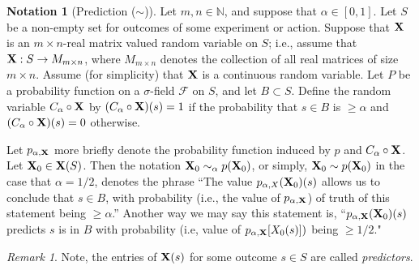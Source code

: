 \documentclass[12pt]{amsart}
\newcommand{\NN}{{\mathbb N}}
\theoremstyle{definition}
\newtheorem{notation}[theorem]{Notation}
\theoremstyle{remark}
\newtheorem{remark}[theorem]{Remark}
\begin{document}
\begin{notation}[Prediction ($\sim$)]
        Let $m,n\in\NN$, and suppose that $\alpha\in[0,1]$. Let $S$ be a non-empty
        set for outcomes of some experiment or action. Suppose that ${\bf X}$ is 
        an $m\times n$-real matrix valued random variable on $S$; i.e., assume 
        that ${\bf X}:S\rightarrow M_{m\times n}$, where $M_{m\times n}$ denotes
        the collection of all real matrices of size $m\times n$. 
        Assume (for simplicity) that ${\bf X}$ is a continuous random variable. 
        Let $P$ be a probability function on a $\sigma$-field ${\mathcal F}$ on 
        $S$, and let $B\subset S$. Define the random variable $C_\alpha\circ{\bf X}$
        by $(C_\alpha\circ{\bf X})(s)=1$ if the probability that $s\in B$ is 
        $\geq \alpha$ and $(C_\alpha\circ{\bf X})(s)=0$ otherwise.
        
        Let $p_{\alpha,{\bf X}}$ more briefly denote the probability function induced 
        by $p$ and ${C_\alpha\circ \bf X}$. Let ${\bf X}_0\in {\bf X}(S)$.  Then the notation 
        ${\bf X}_0 \sim_\alpha p({\bf X}_0)$, or simply, ${\bf X}_0\sim p({\bf X}_0)$ 
        in the case that $\alpha=1/2$, denotes the phrase ``The value $p_{\alpha,X}({\bf X}_0)(s)$
        allows us to conclude that $s\in B$, with probability (i.e., the value of $p_{\alpha,{\bf X}}$) of truth of 
        this statement being $\geq \alpha$.''  Another way we may say this statement
        is, ``$p_{\alpha,{\bf X}}({\bf X}_0)(s)$ predicts $s$ is in $B$ with probability (i.e, value of $p_{\alpha,
        {\bf X}}[X_0(s)])$ being $\geq 1/2$."
\end{notation}

\begin{remark}
        Note, the entries of ${\bf X}(s)$ for some outcome $s\in S$ are called {\em predictors}.
\end{remark}
\end{document}

